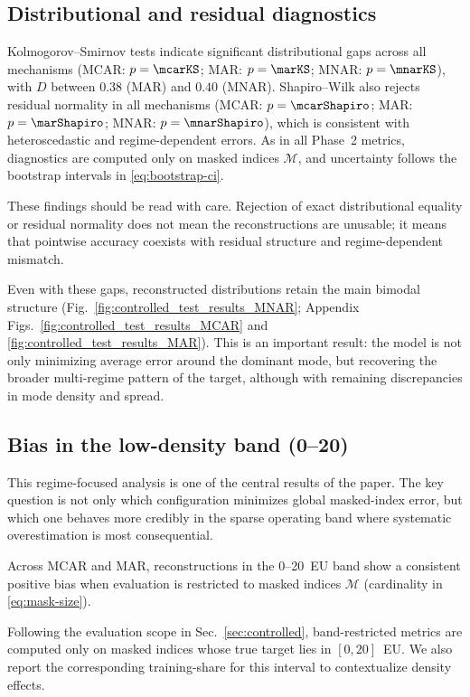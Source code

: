 \subsection{Distributional and residual diagnostics}
Kolmogorov--Smirnov tests indicate significant distributional gaps across all mechanisms (MCAR: $p=\mcarKS$; MAR: $p=\marKS$; MNAR: $p=\mnarKS$), with $D$ between $0.38$ (MAR) and $0.40$ (MNAR). Shapiro--Wilk also rejects residual normality in all mechanisms (MCAR: $p=\mcarShapiro$; MAR: $p=\marShapiro$; MNAR: $p=\mnarShapiro$), which is consistent with heteroscedastic and regime-dependent errors. As in all Phase~2 metrics, diagnostics are computed only on masked indices $\mathcal{M}$, and uncertainty follows the bootstrap intervals in \eqref{eq:bootstrap-ci}.

These findings should be read with care. Rejection of exact distributional equality or residual normality does not mean the reconstructions are unusable; it means that pointwise accuracy coexists with residual structure and regime-dependent mismatch.

Even with these gaps, reconstructed distributions retain the main bimodal structure (Fig.~\ref{fig:controlled_test_results_MNAR}; Appendix Figs.~\ref{fig:controlled_test_results_MCAR} and \ref{fig:controlled_test_results_MAR}). This is an important result: the model is not only minimizing average error around the dominant mode, but recovering the broader multi-regime pattern of the target, although with remaining discrepancies in mode density and spread.

\subsection{Bias in the low-density band (0--20)}\label{sec:bias-analysis}
This regime-focused analysis is one of the central results of the paper. The key question is not only which configuration minimizes global masked-index error, but which one behaves more credibly in the sparse operating band where systematic overestimation is most consequential.

Across MCAR and MAR, reconstructions in the 0--20~EU band show a consistent positive bias when evaluation is restricted to masked indices $\mathcal{M}$ (cardinality in \eqref{eq:mask-size}).

Following the evaluation scope in Sec.~\ref{sec:controlled}, band-restricted metrics are computed only on masked indices whose true target lies in $[0,20]$~EU. We also report the corresponding training-share for this interval to contextualize density effects.

